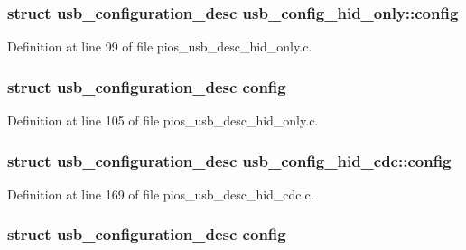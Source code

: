 \hypertarget{group___p_i_o_s___u_s_b___d_e_s_c_gae5e25501e424468c229df0d1e09423a8}{
\subsubsection[{config}]{\setlength{\rightskip}{0pt plus 5cm}struct {\bf usb\-\_\-configuration\-\_\-desc} {\bf usb\-\_\-config\-\_\-hid\-\_\-only\-::config}}}\label{group___p_i_o_s___u_s_b___d_e_s_c_gae5e25501e424468c229df0d1e09423a8}


\-Definition at line 99 of file pios\-\_\-usb\-\_\-desc\-\_\-hid\-\_\-only.\-c.

\hypertarget{group___p_i_o_s___u_s_b___d_e_s_c_ga6517677dcb9452a3759e7ec7e360e690}{
\subsubsection[{config}]{\setlength{\rightskip}{0pt plus 5cm}struct {\bf usb\-\_\-configuration\-\_\-desc} {\bf config}}}\label{group___p_i_o_s___u_s_b___d_e_s_c_ga6517677dcb9452a3759e7ec7e360e690}


\-Definition at line 105 of file pios\-\_\-usb\-\_\-desc\-\_\-hid\-\_\-only.\-c.

\hypertarget{group___p_i_o_s___u_s_b___d_e_s_c_ga41025645591a4ff38c6bfb3bf799cdf1}{
\subsubsection[{config}]{\setlength{\rightskip}{0pt plus 5cm}struct {\bf usb\-\_\-configuration\-\_\-desc} {\bf usb\-\_\-config\-\_\-hid\-\_\-cdc\-::config}}}\label{group___p_i_o_s___u_s_b___d_e_s_c_ga41025645591a4ff38c6bfb3bf799cdf1}


\-Definition at line 169 of file pios\-\_\-usb\-\_\-desc\-\_\-hid\-\_\-cdc.\-c.

\hypertarget{group___p_i_o_s___u_s_b___d_e_s_c_ga6517677dcb9452a3759e7ec7e360e690}{
\subsubsection[{config}]{\setlength{\rightskip}{0pt plus 5cm}struct {\bf usb\-\_\-configuration\-\_\-desc} {\bf config}}}\label{group___p_i_o_s___u_s_b___d_e_s_c_ga6517677dcb9452a3759e7ec7e360e690}



